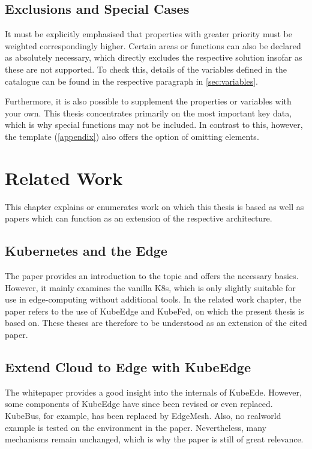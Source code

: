 \documentclass[MIC,Master,english]{twbook}%
\begin{document}
\section{Exclusions and Special Cases}
\label{sec:exclusions}
It must be explicitly emphasised that properties with greater priority must be weighted correspondingly higher. Certain areas or functions can also be declared as absolutely necessary, which directly excludes the respective solution insofar as these are not supported. To check this, details of the variables defined in the catalogue can be found in the respective paragraph in \autoref{sec:variables}. \par
Furthermore, it is also possible to supplement the properties or variables with your own. This thesis concentrates primarily on the most important key data, which is why special functions may not be included. In contrast to this, however, the template (\autoref{appendix}) also offers the option of omitting elements.

\pagebreak
\chapter{Related Work}
\label{chap:related}
This chapter explains or enumerates work on which this thesis is based as well as papers which can function as an extension of the respective architecture.

\section{Kubernetes and the Edge}
The paper \cite{hal-kubeedge} provides an introduction to the topic and offers the necessary basics. However, it mainly examines the vanilla \ac{K8s}, which is only slightly suitable for use in edge-computing without additional tools. In the related work chapter, the paper refers to the use of KubeEdge and KubeFed, on which the present thesis is based on. These theses are therefore to be understood as an extension of the cited paper.

\section{Extend Cloud to Edge with KubeEdge}
The whitepaper \cite{kubedge} provides a good insight into the internals of KubeEde. However, some components of KubeEdge have since been revised or even replaced. KubeBus, for example, has been replaced by EdgeMesh. Also, no realworld example is tested on the environment in the paper. Nevertheless, many mechanisms remain unchanged, which is why the paper is still of great relevance.
\end{document}
